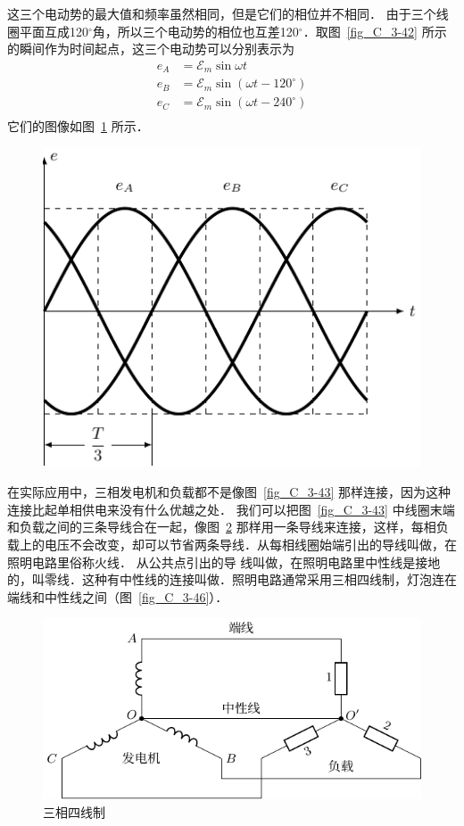 这三个电动势的最大值和频率虽然相同，但是它们的相位并不相同．
由于三个线圈平面互成120$^\circ$角，所以三个电动势的相位也互差120$^\circ$．取图~\ref{fig_C_3-42} 所示的瞬间作为时间起点，这三个电动势可以分别表示为
\[\begin{split}
e_A&=\mathcal{E}_m\sin \omega t\\
e_B&=\mathcal{E}_m\sin (\omega t-120^\circ)\\
e_C&=\mathcal{E}_m\sin (\omega t-240^\circ)\\
\end{split}\]
它们的图像如图~\ref{fig_C_3-44} 所示．
\begin{figure}[htbp]
    \centering
    \includegraphics{fig/C/3-44.pdf}
    \caption{}\label{fig_C_3-44}
\end{figure}

在实际应用中，三相发电机和负载都不是像图~\ref{fig_C_3-43} 那样连接，因为这种连接比起单相供电来没有什么优越之处．
我们可以把图~\ref{fig_C_3-43} 中线圈末端和负载之间的三条导线合在一起，像图~\ref{fig_C_3-45} 那样用一条导线来连接，这样，每相负载上的电压不会改变，却可以节省两条导线．从每相线圈始端引出的导线叫做，在照明电路里俗称火线．
从公共点引出的导
线叫做，在照明电路里中性线是接地的，叫零线．这种有中性线的连接叫做．照明电路通常采用三相四线制，灯泡连在端线和中性线之间（图~\ref{fig_C_3-46}）．
\begin{figure}[htbp]
    \centering
    \includegraphics{fig/C/3-45.pdf}
    \caption{三相四线制}\label{fig_C_3-45}
\end{figure}

